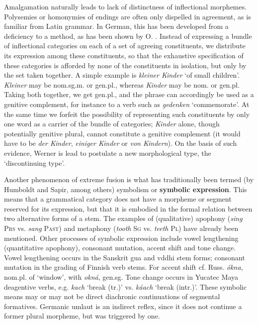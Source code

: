 Amalgamation naturally leads to lack of distinctness of inflectional morphemes. Polysemies or homonymies of endings are often only dispelled in agreement, as is familiar from Latin grammar. In German, this has been developed from a deficiency to a method, as has been shown by O. \citet{Werner1979}. Instead of expressing a bundle of inflectional categories on each of a set of agreeing constituents, we distribute its expression among these constituents, so that the exhaustive specification of these categories is afforded by none of the constituents in isolation, but only by the set taken together. A simple example is \textit{kleiner Kinder} ‘of small children’. \textit{Kleiner} may be nom.sg.m. or gen.pl., whereas \textit{Kinder} may be nom. or gen.pl. Taking both together, we get gen.pl., and the phrase can accordingly be used as a genitive complement, for instance to a verb such as \textit{gedenken} ‘commemorate’. At the same time we forfeit the possibility of representing such constituents by only one word as a carrier of the bundle of categories; \textit{Kinder} alone, though potentially genitive plural, cannot constitute a genitive complement (it would have to be \textit{der Kinder}, \textit{einiger Kinder} or \textit{von Kindern}). On the basis of such evidence, Werner is lead to postulate a new morphological type, the ‘discontinuing type’.

Another phenomenon of extreme fusion is what has traditionally been termed (by Humboldt and Sapir, among others) symbolism or \textbf{symbolic expression}. This means that a grammatical category does not have a morpheme or segment reserved for its expression, but that it is embodied in the formal relation between two alternative forms of a stem. The examples of (qualitative) apophony (\textit{sing} \textsc{Prs} vs. \textit{sang} \textsc{Past}) and metaphony (\textit{tooth} \textsc{Sg} vs. \textit{teeth} \textsc{Pl}) have already been mentioned. Other processes of symbolic expression include vowel lengthening (quantitative apophony), consonant mutation, accent shift and tone change. Vowel lengthening occurs in the Sanskrit gua and vddhi stem forms; consonant mutation in the grading of Finnish verb stems. For accent shift cf. Russ. \textit{ókna}, nom.pl. of ‘window’, with \textit{okná}, gen.sg. Tone change occurs in Yucatec Maya deagentive verbs, e.g. \textit{kach} ‘break (tr.)’ vs. \textit{káach} ‘break (intr.)’. These symbolic means may or may not be direct diachronic continuations of segmental formatives. Germanic umlaut is an indirect reflex, since it does not continue a former plural morpheme, but was triggered by one.

